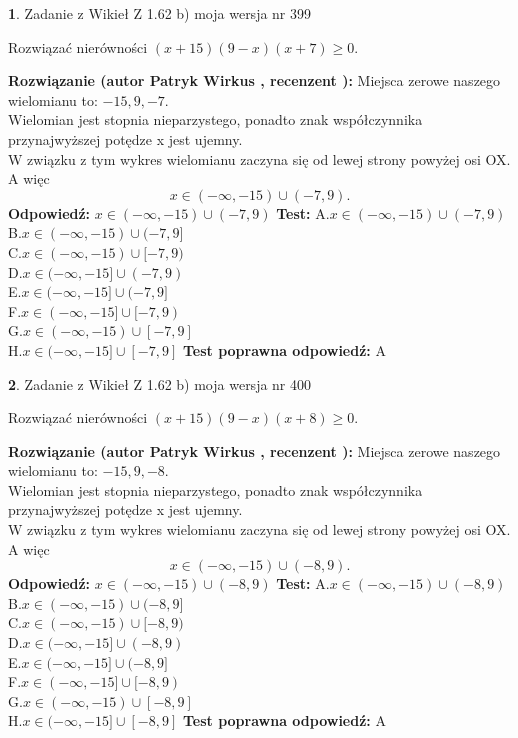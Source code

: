 \documentclass[12pt, a4paper]{article}
\theoremstyle{definition} %
\newtheorem{zad}{}
\newcommand{\zadStart}[1]{\begin{zad}#1\newline}
\newcommand{\zadStop}{\end{zad}}
\newcommand{\rozwStart}[2]{\noindent \textbf{Rozwiązanie (autor #1 , recenzent #2): }\newline}
\newcommand{\rozwStop}{\newline}
\newcommand{\odpStart}{\noindent \textbf{Odpowiedź:}\newline}
\newcommand{\odpStop}{\newline}
\newcommand{\testStart}{\noindent \textbf{Test:}\newline}
\newcommand{\testStop}{\newline}
\newcommand{\kluczStart}{\noindent \textbf{Test poprawna odpowiedź:}\newline}
\newcommand{\kluczStop}{\newline}
\begin{document}
\zadStart{Zadanie z Wikieł Z 1.62 b) moja wersja nr 399}

Rozwiązać nierówności $(x+15)(9-x)(x+7)\ge0$.
\zadStop
\rozwStart{Patryk Wirkus}{}
Miejsca zerowe naszego wielomianu to: $-15, 9, -7$.\\
Wielomian jest stopnia nieparzystego, ponadto znak współczynnika przy\linebreak najwyższej potędze x jest ujemny.\\ W związku z tym wykres wielomianu zaczyna się od lewej strony powyżej osi OX. A więc $$x \in (-\infty,-15) \cup (-7,9).$$
\rozwStop
\odpStart
$x \in (-\infty,-15) \cup (-7,9)$
\odpStop
\testStart
A.$x \in (-\infty,-15) \cup (-7,9)$\\
B.$x \in (-\infty,-15) \cup (-7,9]$\\
C.$x \in (-\infty,-15) \cup [-7,9)$\\
D.$x \in (-\infty,-15] \cup (-7,9)$\\
E.$x \in (-\infty,-15] \cup (-7,9]$\\
F.$x \in (-\infty,-15] \cup [-7,9)$\\
G.$x \in (-\infty,-15) \cup [-7,9]$\\
H.$x \in (-\infty,-15] \cup [-7,9]$
\testStop
\kluczStart
A
\kluczStop



\zadStart{Zadanie z Wikieł Z 1.62 b) moja wersja nr 400}

Rozwiązać nierówności $(x+15)(9-x)(x+8)\ge0$.
\zadStop
\rozwStart{Patryk Wirkus}{}
Miejsca zerowe naszego wielomianu to: $-15, 9, -8$.\\
Wielomian jest stopnia nieparzystego, ponadto znak współczynnika przy\linebreak najwyższej potędze x jest ujemny.\\ W związku z tym wykres wielomianu zaczyna się od lewej strony powyżej osi OX. A więc $$x \in (-\infty,-15) \cup (-8,9).$$
\rozwStop
\odpStart
$x \in (-\infty,-15) \cup (-8,9)$
\odpStop
\testStart
A.$x \in (-\infty,-15) \cup (-8,9)$\\
B.$x \in (-\infty,-15) \cup (-8,9]$\\
C.$x \in (-\infty,-15) \cup [-8,9)$\\
D.$x \in (-\infty,-15] \cup (-8,9)$\\
E.$x \in (-\infty,-15] \cup (-8,9]$\\
F.$x \in (-\infty,-15] \cup [-8,9)$\\
G.$x \in (-\infty,-15) \cup [-8,9]$\\
H.$x \in (-\infty,-15] \cup [-8,9]$
\testStop
\kluczStart
A
\kluczStop
\end{document}
